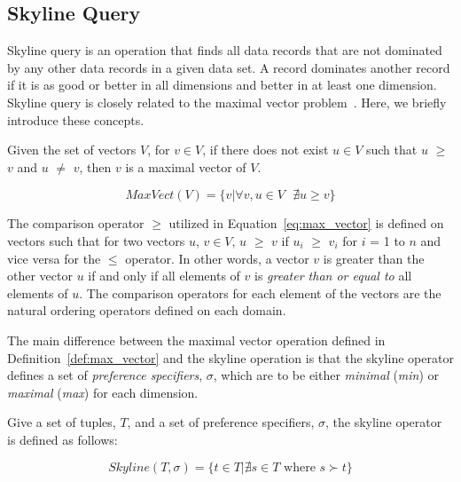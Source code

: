 
\subsection{Skyline Query}\label{sec:skyline_operator}

Skyline query is an operation that finds all data records that
are not dominated by any other data records in a given data set. A
record dominates another record if it is as good or better in all
dimensions and better in at least one dimension. Skyline query is
closely related to the maximal vector
problem~\cite{journals/jacm/KungLP75,conf/vldb/GodfreySG05}. Here,
we briefly introduce these concepts.

\begin{definition}\label{def:max_vector}
Given the set of vectors $V$, for $v \in V$, if there does not
exist $u \in V$ such that $u$ $\geq$ $v$ and $u$ $\neq$ $v$, then
$v$ is a maximal vector of $V$.

\begin{equation}\label{eq:max_vector}
    MaxVect(V) = \{v | \forall v, u \in V \mbox{ } \nexists u \geq v\}
\end{equation}

\end{definition}

The comparison operator $\geq$ utilized in
Equation~\ref{eq:max_vector} is defined on vectors such that for
two vectors $u$, $v \in V$, $u$ $\geq$ $v$ if $u_i$ $\geq$ $v_i$
for $i$ = 1 to $n$ and vice versa for the $\leq$ operator. In
other words, a vector $v$ is greater than the other vector $u$ if
and only if all elements of $v$ is \emph{greater than or equal to}
all elements of $u$. The comparison operators for each element of
the vectors are the natural ordering operators defined on each
domain.

The main difference between the maximal vector operation defined
in Definition~\ref{def:max_vector} and the skyline operation is
that the skyline operator defines a set of \emph{preference
specifiers}, $\sigma$, which are to be either \emph{minimal}
(\emph{min}) or \emph{maximal} (\emph{max}) for each dimension.


\begin{definition}\label{def:skyline}
Give a set of tuples, $T$, and a set of preference specifiers,
$\sigma$, the skyline operator is defined as follows:

\begin{equation}\label{eq:skyline}
    Skyline(T, \sigma) = \{t \in T | \nexists s \in T \text{ where } s \succ t \}
\end{equation}

\end{definition}

